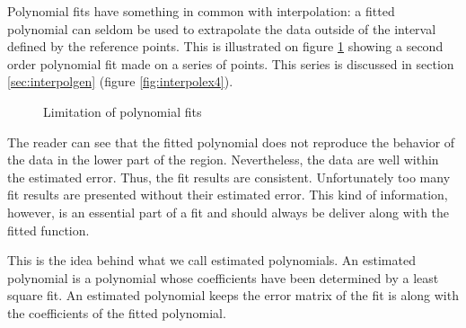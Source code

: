\documentclass[twoside]{book}
\begin{document}
Polynomial fits have something in common with interpolation: a
fitted polynomial can seldom be used to extrapolate the data
outside of the interval defined by the reference points. This is
illustrated on figure \ref{fig:polFitLimit} showing a second order
polynomial fit made on a series of points. This series is
discussed in section \ref{sec:interpolgen} (figure
\ref{fig:interpolex4}).
\begin{figure}
\center{}
\caption{Limitation of polynomial fits}\label{fig:polFitLimit}
\end{figure}
The reader can see that the fitted polynomial does not reproduce
the behavior of the data in the lower part of the region.
Nevertheless, the data are well within the estimated error. Thus,
the fit results are consistent. Unfortunately too many fit results
are presented without their estimated error. This kind of
information, however, is an essential part of a fit and should
always be deliver along with the fitted function.

This is the idea behind what we call estimated polynomials. An
estimated polynomial is a polynomial whose coefficients have been
determined by a least square fit. An estimated polynomial keeps
the error matrix of the fit is along with the coefficients of the
fitted polynomial.
\end{document}
